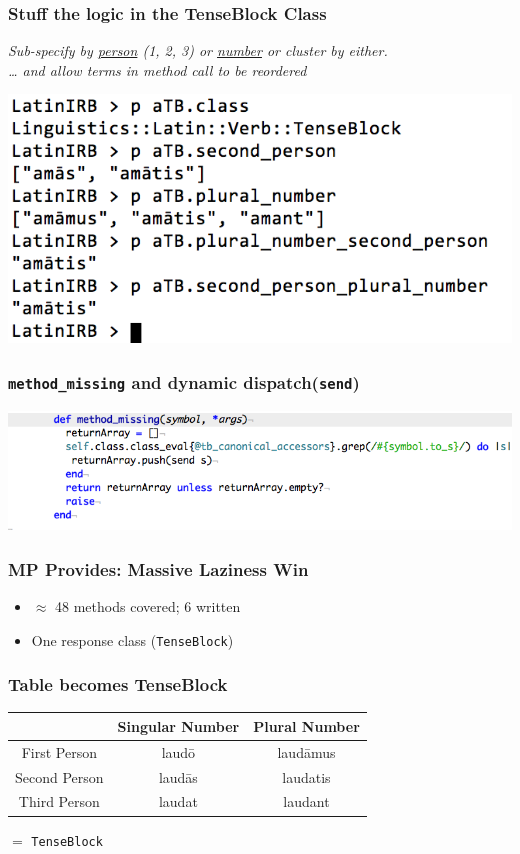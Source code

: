 \documentclass[slidestop,compress,mathserif]{beamer}
\begin{document}
\begin{frame}
	\frametitle{Stuff the logic in the TenseBlock Class}
	\emph{
		Sub-specify by \underline{person} (1, 2, 3) or \underline{number} or
    cluster by either. \\
		\pause
		{\ldots} and allow terms in method call to be reordered
  }
	\vskip 0.5cm
	\begin{center}
		\includegraphics[scale=0.38]{img/conj_subspec.png}
	\end{center}
\end{frame}

\begin{frame}
	\frametitle{\texttt{method\_missing} and dynamic dispatch(\texttt{send})}
	\includegraphics[scale=0.55]{img/tenseblock_mm.png}
\end{frame}

\begin{frame}
	\frametitle{MP Provides:  Massive Laziness Win}
	\begin{itemize}
		\item $\approx$ 48 methods covered; 6 written
		\pause
		\item One response class (\texttt{TenseBlock})
	\end{itemize}
\end{frame}

\begin{frame}
	\frametitle{Table becomes TenseBlock}
	\begin{center}
		\begin{tabular}{|c|c|c|}
			\hline
			  & Singular Number &  Plural Number\\
			\hline
			First Person  & laud\={o}  & laud\={a}mus\\
			Second Person & laud\={a}s & laudatis \\
			Third Person  & laudat     & laudant \\
			\hline
		\end{tabular}
		\vskip 0.5cm
		$=$
		\vskip 0.5cm
		\texttt{TenseBlock}
	\end{center}
\end{frame}
\end{document}
